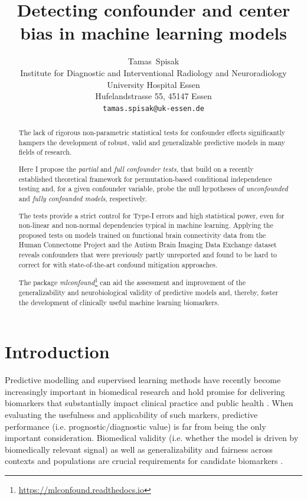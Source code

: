 \documentclass{article}
\title{Detecting confounder and center bias in machine learning models}
\author{
  Tamas~Spisak \\
  Institute for Diagnostic and Interventional Radiology and Neuroradiology \\
  University Hospital Essen\\
  Hufelandstrasse 55, 45147 Essen \\
  \texttt{tamas.spisak@uk-essen.de} \\
}
\begin{document}
\maketitle

\begin{abstract} %
The lack of rigorous non-parametric statistical tests for confounder effects significantly hampers the development of robust, valid and generalizable predictive models in many fields of research.

Here I propose the \emph{partial} and \emph{full confounder tests}, that build on a recently established theoretical framework for permutation-based conditional independence testing and, for a given confounder variable, probe the null hypotheses of \emph{unconfounded} and \emph{fully confounded models}, respectively.

The tests provide a strict control for Type-I errors and high statistical power, even for non-linear and non-normal dependencies typical in machine learning.
Applying the proposed tests on models trained on functional brain connectivity data from the Human Connectome Project and the Autism Brain Imaging Data Exchange dataset reveals confounders that were previously partly unreported and found to be hard to correct for with state-of-the-art confound mitigation approaches.

The package \emph{mlconfound}\footnote{\href{https://mlconfound.readthedocs.io}{https://mlconfound.readthedocs.io}} can aid the assessment and improvement of the generalizability and neurobiological validity of predictive models and, thereby, foster the development of clinically useful machine learning biomarkers.
\end{abstract}



\section{Introduction}

Predictive modelling and supervised learning methods have recently become increasingly important in biomedical research and hold promise for delivering biomarkers that substantially impact clinical practice and public health \citep{kent2018personalized, spisak2020pain, walsh2021dome}. When evaluating the usefulness and applicability of such markers, predictive performance (i.e. prognostic/diagnostic value) is far from being the only important consideration. Biomedical validity (i.e. whether the model is driven by biomedically relevant signal) as well as generalizability and fairness across contexts and populations are crucial requirements for candidate biomarkers \citep{woo2017building, obermeyer2019dissecting, mehrabi2021survey}.
\end{document}
